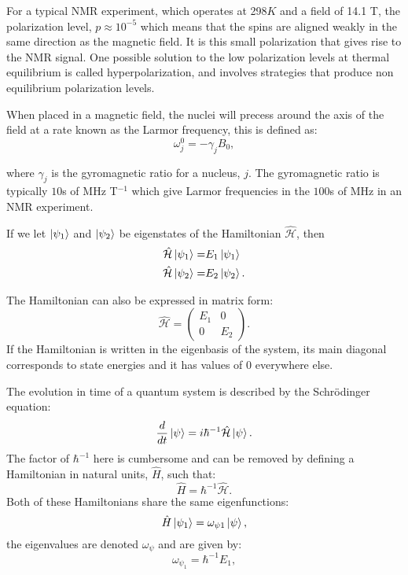For a typical NMR experiment, which operates at 298$K$ and
a field of 14.1 T, the polarization level, $p \approx 10^{-5}$ which means that the spins are aligned weakly
in the same direction as the magnetic field. It is this small polarization that gives rise to the NMR
signal. One possible solution to the low polarization levels at thermal equilibrium is called hyperpolarization, and
involves strategies that produce non equilibrium polarization levels.

When placed in a magnetic field, the nuclei will precess around the axis of the field at a rate known as the Larmor frequency, this is defined as:
\begin{equation}\label{eqn:Larmor}
  \omega_j^0 = -\gamma_jB_0,
\end{equation}

where $\gamma_j$ is the gyromagnetic ratio for a nucleus, $j$. The gyromagnetic ratio is
typically $10$s of MHz T$^{-1}$ which give Larmor frequencies in the $100$s of MHz in an NMR
experiment.


If we let $\ket{\psi_1}$ and $\ket{\psi_2}$ be eigenstates of the Hamiltonian $\hat{\mathcal{H}}$, then
\begin{align}
  \hat{\mathcal{H}}\ket{\psi_1} =& E_1\ket{\psi_1}\\
  \hat{\mathcal{H}}\ket{\psi_2} =& E_2\ket{\psi_2}.
\end{align}

The Hamiltonian can also be expressed in matrix form:
\begin{equation}
  \hat{\mathcal{H}} = \begin{pmatrix}
    E_1 & 0\\
    0 & E_2
\end{pmatrix}.
\end{equation}
If the Hamiltonian is written in the eigenbasis of the system, its main diagonal corresponds to state energies and it has values of $0$ everywhere else.

The evolution in time of a quantum system is described by the Schr\"odinger equation:
\begin{equation}
  \frac{d}{dt}\ket{\psi} = i\hbar^{-1}\hat{\mathcal{H}}\ket{\psi}.
\end{equation}
The factor of $\hbar^{-1}$ here is cumbersome and can be removed by defining a Hamiltonian in natural units, $\hat{H}$,
such that:
\begin{equation}
  \hat{H} = \hbar^{-1}\hat{\mathcal{H}}.
\end{equation}
Both of these Hamiltonians share the same eigenfunctions:
\begin{equation}
  \hat{H}\ket{\psi_1} = \omega_{\psi1}\ket{\psi},
\end{equation}
the eigenvalues are denoted $\omega_{\psi}$ and are given by:
\begin{equation}
  \omega_{\psi_1} = \hbar^{-1}E_1,
\end{equation}

